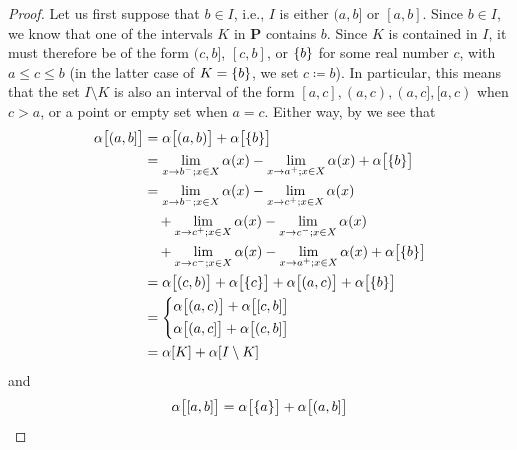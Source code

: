 \begin{proof}
      Let us first suppose that \(b \in I\), i.e., \(I\) is either \((a, b]\) or \([a, b]\).
  Since \(b \in I\), we know that one of the intervals \(K\) in \(\mathbf{P}\) contains \(b\).
  Since \(K\) is contained in \(I\), it must therefore be of the form \((c, b]\), \([c, b]\), or \(\left\lbrace b\right\rbrace\) for some real number \(c\), with \(a \leq c \leq b\) (in the latter case of \(K = \left\lbrace b\right\rbrace\), we set \(c \coloneqq b\)).
  In particular, this means that the set \(I \setminus K\) is also an interval of the form \([a, c], (a, c), (a, c], [a, c)\) when \(c > a\), or a point or empty set when \(a = c\).
  Either way, by  we see that
  \begin{align*}
    \alpha\big[(a, b]\big] & = \alpha\big[(a, b)\big] + \alpha\big[\set{b}\big]                                                            \\
                           & = \lim_{x \to b^- ; x \in X} \alpha(x) - \lim_{x \to a^+ ; x \in X} \alpha(x) + \alpha\big[\set{b}\big]       \\
                           & = \lim_{x \to b^- ; x \in X} \alpha(x) - \lim_{x \to c^+ ; x \in X} \alpha(x)                                 \\
                           & \quad + \lim_{x \to c^+ ; x \in X} \alpha(x) - \lim_{x \to c^- ; x \in X} \alpha(x)                           \\
                           & \quad + \lim_{x \to c^- ; x \in X} \alpha(x) - \lim_{x \to a^+ ; x \in X} \alpha(x) + \alpha\big[\set{b}\big] \\
                           & = \alpha\big[(c, b)\big] + \alpha\big[\set{c}\big] + \alpha\big[(a, c)\big] + \alpha\big[\set{b}\big]         \\
                           & = \begin{dcases}
                                 \alpha\big[(a, c)\big] + \alpha\big[[c, b]\big] \\
                                 \alpha\big[(a, c]\big] + \alpha\big[(c, b]\big]
                               \end{dcases}                           \\
                           & = \alpha[K] + \alpha[I \setminus K]
  \end{align*}
  and
  \begin{align*}
    \alpha\big[[a, b]\big] & = \alpha\big[\set{a}\big] + \alpha\big[(a, b]\big]                                                                             \\

\end{align*}
\end{proof}
